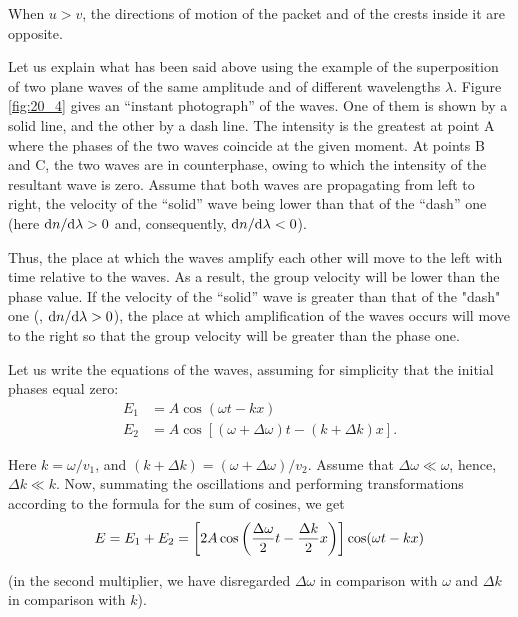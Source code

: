 When $u>v$, the directions of motion of the packet and of the crests inside it are opposite.

Let us explain what has been said above using the example of the superposition of two plane waves of the same amplitude and of different wavelengths $\lambda$.
Figure \ref{fig:20_4} gives an ``instant photograph'' of the waves.
One of them is shown by a solid line, and the other by a dash line.
The intensity is the greatest at point A where the phases of the two waves coincide at the given moment.
At points B and C, the two waves are in counterphase, owing to which the intensity of the
resultant wave is zero.
Assume that both waves are propagating from left to right, the velocity of the ``solid'' wave being lower than that of the ``dash'' one (here $\mathrm{d} n/\mathrm{d}\lambda>0$ and, consequently, $\mathrm{d} n/\mathrm{d}\lambda<0$).

Thus, the place at which the waves amplify each other will move to the left with time relative to the waves.
As a result, the group velocity will be lower than the phase value.
If the velocity of the ``solid'' wave is greater than that of the "dash" one (\ie, $\mathrm{d} n/\mathrm{d}\lambda>0$), the place at which amplification of the waves occurs will move to the right so that the group velocity will be greater than the phase one.

Let us write the equations of the waves, assuming for simplicity that the initial phases equal zero:
\begin{align*}
	E_1 &= A \cos(\omega t - k x)\\
	E_2 &= A \cos[(\omega+\Delta{\omega}) t - (k+\Delta{k}) x].
\end{align*}

Here $k=\omega/v_1$, and $(k+\Delta{k}) = (\omega+ \Delta{\omega})/v_2$.
Assume that $\Delta{\omega}\ll\omega$, hence, $\Delta{k}\ll k$.
Now, summating the oscillations and performing transformations according to the formula for the sum of cosines, we get
\begin{equation}\label{eq:20_6}
	E = E_1 + E_2 = \left[2A\cos\left(\frac{\Delta\omega}{2} t - \frac{\Delta{k}}{2}x\right)\right] \cos(\omega t - kx)
\end{equation}

\noindent
(in the second multiplier, we have disregarded $\Delta{\omega}$ in comparison with $\omega$ and $\Delta{k}$ in comparison with $k$).

